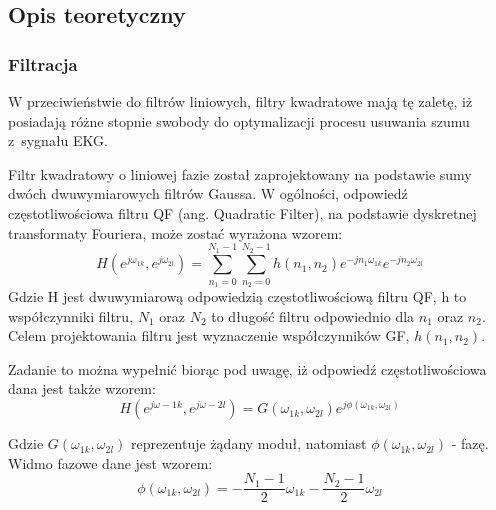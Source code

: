 \documentclass[10pt,a4paper]{article}
\begin{document}
\subsection{Opis teoretyczny}
\bigskip
\subsubsection{Filtracja}
\bigskip
W przeciwieństwie do filtrów liniowych, filtry kwadratowe mają tę zaletę, iż posiadają różne stopnie swobody do optymalizacji procesu usuwania szumu z~sygnału EKG.

Filtr kwadratowy o liniowej fazie został zaprojektowany na podstawie sumy dwóch dwuwymiarowych filtrów Gaussa. W ogólności, odpowiedź częstotliwościowa filtru QF (ang. Quadratic Filter), na podstawie dyskretnej transformaty Fouriera, może zostać wyrażona wzorem:
\medskip
\begin{equation}
\label{QF1}
H(e^{j\omega_{1k}},e^{j\omega_{2l}})=\sum_{n_1=0}^{N_1-1}\sum_{n_2=0}^{N_2-1}h(n_1,n_2)e^{-jn_1\omega_{1k}}e^{-jn_2\omega_{2l}}
\end{equation}
\medskip
Gdzie H jest dwuwymiarową odpowiedzią częstotliwościową filtru QF, h to współczynniki filtru, \begin{math}N_{1}\end{math} oraz \begin{math}N_{2}\end{math} to długość filtru odpowiednio dla \begin{math}n_{1}\end{math} oraz \begin{math}n_{2}\end{math}. Celem projektowania filtru jest wyznaczenie współczynników GF, \begin{math}h(n_{1},n_{2})\end{math}.

Zadanie to można wypełnić biorąc pod uwagę, iż odpowiedź częstotliwościowa dana jest także wzorem:
\medskip
\begin{equation}
\label{QF2}
H(e^{j\omega-{1k}},e^{j\omega-{2l}})=G(\omega_{1k},\omega_{2l})e^{j\phi(\omega_{1k},\omega_{2l})}
\end{equation}
\medskip

Gdzie \begin{math}G(\omega_{1k},\omega_{2l})\end{math} reprezentuje żądany moduł, natomiast \begin{math}\phi(\omega_{1k},\omega_{2l})\end{math} - fazę. Widmo fazowe dane jest wzorem:
\medskip
\begin{equation}
\label{QF3 - widmo fazowe}
\phi(\omega_{1k},\omega_{2l})=-\frac{N_1-1}{2}\omega_{1k}-\frac{N_2-1}{2}\omega_{2l}
\end{equation}
\medskip
\end{document}
